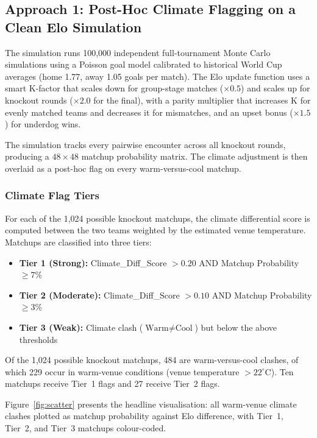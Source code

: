\documentclass[11pt,a4paper]{article}
\begin{document}
\subsection{Approach 1: Post-Hoc Climate Flagging on a Clean Elo Simulation}

The simulation runs 100,000 independent full-tournament Monte Carlo simulations using a Poisson goal model calibrated to historical World Cup averages (home 1.77, away 1.05 goals per match). The Elo update function uses a smart K-factor that scales down for group-stage matches ($\times 0.5$) and scales up for knockout rounds ($\times 2.0$ for the final), with a parity multiplier that increases K for evenly matched teams and decreases it for mismatches, and an upset bonus ($\times 1.5$) for underdog wins.

The simulation tracks every pairwise encounter across all knockout rounds, producing a $48\times48$ matchup probability matrix. The climate adjustment is then overlaid as a post-hoc flag on every warm-versus-cool matchup.

\subsubsection{Climate Flag Tiers}
For each of the 1,024 possible knockout matchups, the climate differential score is computed between the two teams weighted by the estimated venue temperature. Matchups are classified into three tiers:

\begin{itemize}[leftmargin=*]
    \item \textbf{Tier 1 (Strong):} Climate\_Diff\_Score $> 0.20$ AND Matchup Probability $\geq 7\%$
    \item \textbf{Tier 2 (Moderate):} Climate\_Diff\_Score $> 0.10$ AND Matchup Probability $\geq 3\%$
    \item \textbf{Tier 3 (Weak):} Climate clash ($\text{Warm} \neq \text{Cool}$) but below the above thresholds
\end{itemize}

Of the 1,024 possible knockout matchups, 484 are warm-versus-cool clashes, of which 229 occur in warm-venue conditions (venue temperature $>22^{\circ}$C). Ten matchups receive Tier~1 flags and 27 receive Tier~2 flags.

Figure~\ref{fig:scatter} presents the headline visualisation: all warm-venue climate clashes plotted as matchup probability against Elo difference, with Tier~1, Tier~2, and Tier~3 matchups colour-coded.
\end{document}
